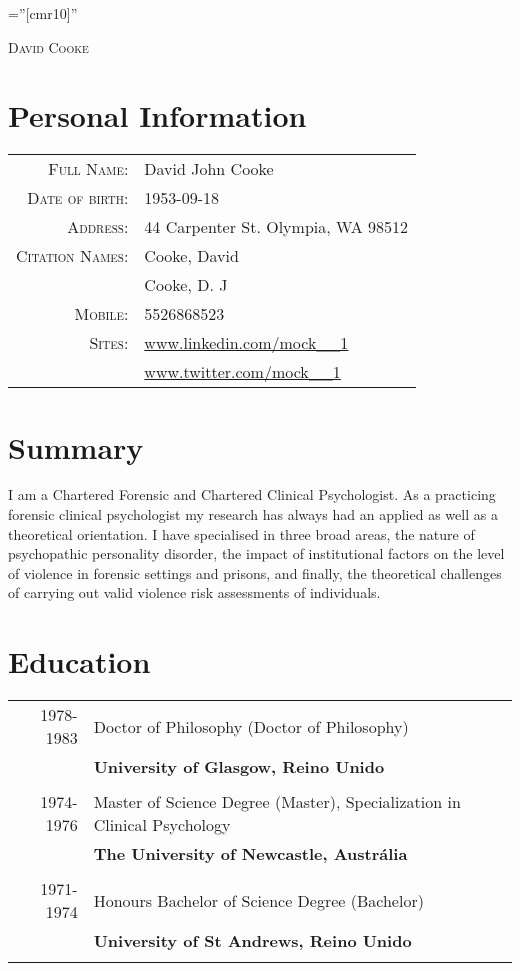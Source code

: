 \documentclass [a4paper,10pt]{article}
\begin{document}
\pagestyle{empty} %

\font\fb=''[cmr10]'' %

\par{\centering
		{\Huge   \textsc{David Cooke }
	}\bigskip\par}

\section{Personal Information}

\begin{tabular}{rl}
    \textsc{Full Name:} & David John Cooke \\
    \textsc{Date of birth:} & 1953-09-18 \\
    \textsc{Address:}   & 44 Carpenter St.
    Olympia, WA 98512\\
    \textsc{Citation Names:}   & Cooke, David \\ & Cooke, D. J\\
    \textsc{Mobile:}     & 5526868523\\
	\textsc{Sites:}     & \url{www.linkedin.com/mock__1} \\ & \url{www.twitter.com/mock__1}\\
\end{tabular}

\section{Summary}
I am a Chartered Forensic and Chartered Clinical Psychologist. As a practicing forensic clinical psychologist my research has always had an applied as well as a theoretical orientation. I have specialised in three broad areas, the nature of psychopathic personality disorder, the impact of institutional factors on the level of violence in forensic settings and prisons, and finally, the theoretical challenges of carrying out valid violence risk assessments of individuals. \\
\section{Education}
\begin{tabular}{r p{11cm}}	
\\
\textsc{1978-1983} & Doctor of Philosophy (Doctor of Philosophy) \\ & \textbf{University of Glasgow, Reino Unido}\\
\\\textsc{1974-1976} & Master of Science Degree (Master), Specialization in Clinical Psychology  \\ & \textbf{The University of Newcastle, Austrália}\\
\\\textsc{1971-1974} & Honours Bachelor of Science Degree (Bachelor) \\ & \textbf{University of St Andrews, Reino Unido}\\
\\
\end{tabular}
\end{document}
